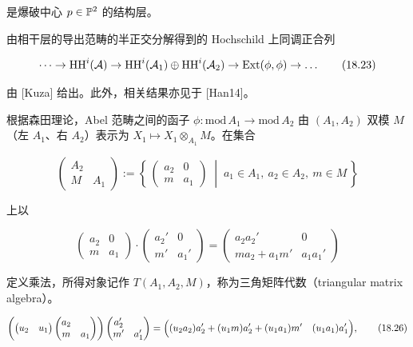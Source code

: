是爆破中心 $p\in\mathbb{P}^{2}$ 的结构层。

由相干层的导出范畴的半正交分解得到的 Hochschild 上同调正合列

\begin{equation}
  \dots \to \mathrm{HH}^{i}(\mathcal{A}) \to \mathrm{HH}^{i}(\mathcal{A}_1)\oplus\mathrm{HH}^{i}(\mathcal{A}_2) \to \operatorname{Ext}(\phi,\phi) \to \dots \tag{18.23}
\end{equation}

由 [Kuza] 给出。此外，相关结果亦见于 [Han14]。

根据森田理论，Abel 范畴之间的函子 $\phi\colon\mathrm{mod}\,A_1\to\mathrm{mod}\,A_2$ 由 $(A_1,A_2)$ 双模 $M$（左 $A_1$、右 $A_2$）表示为 $X_1\mapsto X_1\otimes_{A_1}M$。在集合

\begin{equation}
  \begin{pmatrix} A_2 & \\ M & A_1 \end{pmatrix}
  := \left\{\,
  \begin{pmatrix} a_2 & 0\\ m & a_1 \end{pmatrix}
  \;\middle|\;
  a_1\in A_1,\ a_2\in A_2,\ m\in M
  \,\right\} \tag{18.24}
\end{equation}

上以

\begin{equation}
  \begin{pmatrix} a_2 & 0\\ m & a_1 \end{pmatrix}
  \cdot
  \begin{pmatrix} a_2' & 0\\ m' & a_1' \end{pmatrix}
  =
  \begin{pmatrix} a_2a_2' & 0\\ m a_2 + a_1 m' & a_1a_1' \end{pmatrix} \tag{18.25}
\end{equation}

定义乘法，所得对象记作 $T(A_1,A_2,M)$，称为三角矩阵代数（triangular matrix algebra）。

\begin{equation}
  \left(
  \begin{pmatrix} u_2 & u_1 \end{pmatrix}
  \begin{pmatrix} a_2 & \\ m & a_1 \end{pmatrix}
  \right)
  \begin{pmatrix} a_2' & \\ m' & a_1' \end{pmatrix}
  =
  \Bigl(
  (u_2a_2)a_2' + (u_1m)a_2' + (u_1a_1)m'
  \quad
  (u_1a_1)a_1'
  \Bigr), \tag{18.26}
\end{equation}

